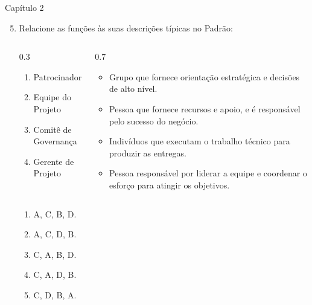 \documentclass{beamer}
\begin{document}
\begin{frame}{Capítulo 2}
	\begin{enumerate}
		\setcounter{enumi}{4}
		\justifying
		\item Relacione as funções às suas descrições típicas no Padrão:
		\begin{columns}
			\begin{column}{0.3\textwidth}				
				\begin{enumerate}[A]
					\footnotesize
					\item Patrocinador
					\item Equipe do Projeto
					\item Comitê de Governança
					\item Gerente de Projeto
				\end{enumerate}
			\end{column}
			
			\begin{column}{0.7\textwidth}
				\begin{itemize}
					\justifying
					\footnotesize
					\item Grupo que fornece orientação estratégica e decisões de alto nível.
					\item Pessoa que fornece recursos e apoio, e é responsável pelo sucesso do negócio.
					\item Indivíduos que executam o trabalho técnico para produzir as entregas.
					\item Pessoa responsável por liderar a equipe e coordenar o esforço para atingir os objetivos.
				\end{itemize}
			\end{column}
		\end{columns}
		\begin{enumerate}[a]
			\item A, C, B, D.
			\item A, C, D, B.
			\item \alert<2>{C, A, B, D}.
			\item C, A, D, B.
			\item C, D, B, A.
		\end{enumerate}
	\end{enumerate}
\end{frame}
\end{document}
